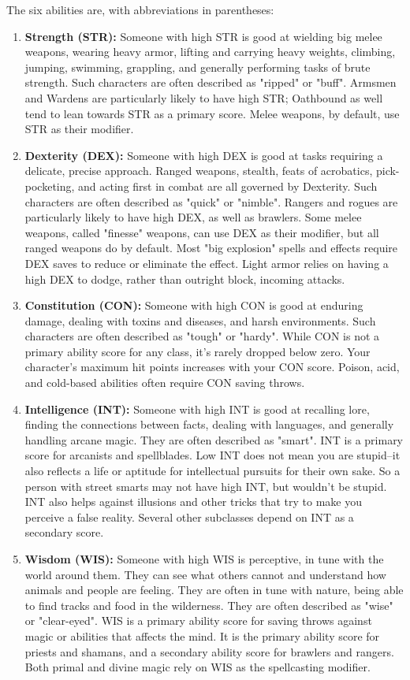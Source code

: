 The six abilities are, with abbreviations in parentheses:
\begin{enumerate}
	\item \textbf{Strength (STR):} Someone with high STR is good at wielding big melee weapons, wearing heavy armor, lifting and carrying heavy weights, climbing, jumping, swimming, grappling, and generally performing tasks of brute strength. Such characters are often described as "ripped" or "buff". Armsmen and Wardens are particularly likely to have high STR; Oathbound as well tend to lean towards STR as a primary score. Melee weapons, by default, use STR as their modifier.
	\item \textbf{Dexterity (DEX):} Someone with high DEX is good at tasks requiring a delicate, precise approach. Ranged weapons, stealth, feats of acrobatics, pick-pocketing, and acting first in combat are all governed by Dexterity. Such characters are often described as "quick" or "nimble". Rangers and rogues are particularly likely to have high DEX, as well as brawlers. Some melee weapons, called "finesse" weapons, can use DEX as their modifier, but all ranged weapons do by default. Most "big explosion" spells and effects require DEX saves to reduce or eliminate the effect. Light armor relies on having a high DEX to dodge, rather than outright block, incoming attacks.
	\item \textbf{Constitution (CON):} Someone with high CON is good at enduring damage, dealing with toxins and diseases, and harsh environments. Such characters are often described as "tough" or "hardy". While CON is not a primary ability score for any class, it's rarely dropped below zero. Your character's maximum hit points increases with your CON score. Poison, acid, and cold-based abilities often require CON saving throws.
    \item \textbf{Intelligence (INT):} Someone with high INT is good at recalling lore, finding the connections between facts, dealing with languages, and generally handling arcane magic. They are often described as "smart". INT is a primary score for arcanists and spellblades. Low INT does not mean you are stupid--it also reflects a life or aptitude for intellectual pursuits for their own sake. So a person with street smarts may not have high INT, but wouldn't be stupid. INT also helps against illusions and other tricks that try to make you perceive a false reality. Several other subclasses depend on INT as a secondary score.
	\item \textbf{Wisdom (WIS):} Someone with high WIS is perceptive, in tune with the world around them. They can see what others cannot and understand how animals and people are feeling. They are often in tune with nature, being able to find tracks and food in the wilderness. They are often described as "wise" or "clear-eyed". WIS is a primary ability score for saving throws against magic or abilities that affects the mind. It is the primary ability score for priests and shamans, and a secondary ability score for brawlers and rangers. Both primal and divine magic rely on WIS as the spellcasting modifier.

\end{enumerate}
